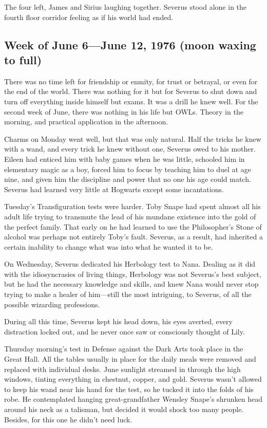 The four left, James and Sirius laughing together. Severus stood alone in the fourth floor corridor feeling as if his world had ended.

\subsection{Week of June 6—June 12, 1976 (moon waxing to full)}

There was no time left for friendship or enmity, for trust or betrayal, or even for the end of the world. There was nothing for it but for Severus to shut down and turn off everything inside himself but exams. It was a drill he knew well. For the second week of June, there was nothing in his life but OWLs. Theory in the morning, and practical application in the afternoon.

Charms on Monday went well, but that was only natural. Half the tricks he knew with a wand, and every trick he knew without one, Severus owed to his mother. Eileen had enticed him with baby games when he was little, schooled him in elementary magic as a boy, forced him to focus by teaching him to duel at age nine, and given him the discipline and power that no one his age could match. Severus had learned very little at Hogwarts except some incantations.

Tuesday's Transfiguration tests were harder. Toby Snape had spent almost all his adult life trying to transmute the lead of his mundane existence into the gold of the perfect family. That early on he had learned to use the Philosopher's Stone of alcohol was perhaps not entirely Toby's fault. Severus, as a result, had inherited a certain inability to change what was into what he wanted it to be.

On Wednesday, Severus dedicated his Herbology test to Nana. Dealing as it did with the idiosyncrasies of living things, Herbology was not Severus's best subject, but he had the necessary knowledge and skills, and knew Nana would never stop trying to make a healer of him—still the most intriguing, to Severus, of all the possible wizarding professions.

During all this time, Severus kept his head down, his eyes averted, every distraction locked out, and he never once saw or consciously thought of Lily.

Thursday morning's test in Defense against the Dark Arts took place in the Great Hall. All the tables usually in place for the daily meals were removed and replaced with individual desks. June sunlight streamed in through the high windows, tinting everything in chestnut, copper, and gold. Severus wasn't allowed to keep his wand near his hand for the test, so he tucked it into the folds of his robe. He contemplated hanging great-grandfather Wensley Snape's shrunken head around his neck as a talisman, but decided it would shock too many people. Besides, for this one he didn't need luck.


